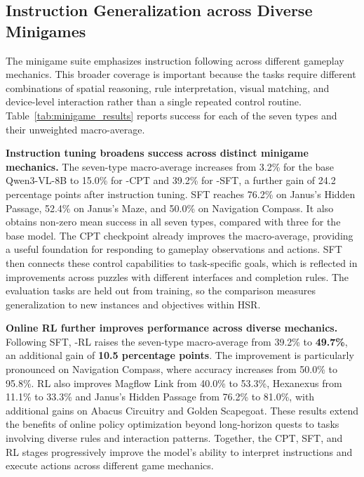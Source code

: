 \subsection{Instruction Generalization across Diverse Minigames}
\label{sec:exp_minigames}

The minigame suite emphasizes instruction following across different gameplay mechanics. This broader coverage is important because the tasks require different combinations of spatial reasoning, rule interpretation, visual matching, and device-level interaction rather than a single repeated control routine. Table~\ref{tab:minigame_results} reports success for each of the seven types and their unweighted macro-average.


\textbf{Instruction tuning broadens success across distinct minigame mechanics.}
The seven-type macro-average increases from 3.2\% for the base Qwen3-VL-8B to 15.0\% for \ourmodel-CPT and 39.2\% for \ourmodel-SFT, a further gain of 24.2 percentage points after instruction tuning. SFT reaches 76.2\% on Janus's Hidden Passage, 52.4\% on Janus's Maze, and 50.0\% on Navigation Compass. It also obtains non-zero mean success in all seven types, compared with three for the base model. The CPT checkpoint already improves the macro-average, providing a useful foundation for responding to gameplay observations and actions. SFT then connects these control capabilities to task-specific goals, which is reflected in improvements across puzzles with different interfaces and completion rules. The evaluation tasks are held out from training, so the comparison measures generalization to new instances and objectives within HSR.

\textbf{Online RL further improves performance across diverse mechanics.}
Following SFT, \ourmodel-RL raises the seven-type macro-average from 39.2\% to \textbf{49.7\%}, an additional gain of \textbf{10.5 percentage points}. The improvement is particularly pronounced on Navigation Compass, where accuracy increases from 50.0\% to 95.8\%. RL also improves Magflow Link from 40.0\% to 53.3\%, Hexanexus from 11.1\% to 33.3\% and Janus’s Hidden Passage from 76.2\% to 81.0\%, with additional gains on Abacus Circuitry and Golden Scapegoat. These results extend the benefits of online policy optimization beyond long-horizon quests to tasks involving diverse rules and interaction patterns. Together, the CPT, SFT, and RL stages progressively improve the model's ability to interpret instructions and execute actions across different game mechanics.

